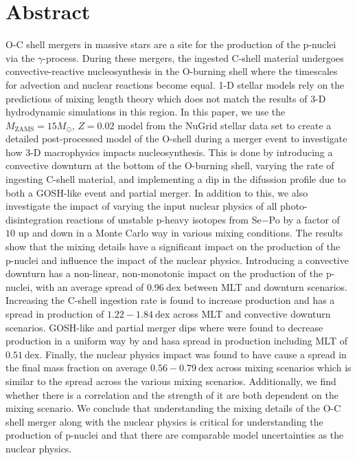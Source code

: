 \newpage
{}

\section*{\large Abstract}

O-C shell mergers in massive stars are a site for the production of the p-nuclei via the $\gamma$-process. 
During these mergers, the ingested C-shell material undergoes convective-reactive nucleosynthesis in the O-burning shell where the timescales for advection and nuclear reactions become equal.
1-D stellar models rely on the predictions of mixing length theory which does not match the results of 3-D hydrodynamic simulations in this region.
In this paper, we use the $M_{\mathrm{ZAMS}}=15 M_\odot$, $Z=0.02$ model from the NuGrid stellar data set \cite{ritterNuGridStellarData2018} to create a detailed post-processed model of the O-shell during a merger event to investigate how 3-D macrophysics impacts nucleosynthesis.
This is done by introducing a convective downturn at the bottom of the O-burning shell, varying the rate of ingesting C-shell material, and implementing a dip in the difussion profile due to both a GOSH-like event and partial merger.
In addition to this, we also investigate the impact of varying the input nuclear physics of all photo-disintegration reactions of unstable p-heavy isotopes from Se$-$Po by a factor of $10$ up and down in a Monte Carlo way in various mixing conditions.
The results show that the mixing details have a significant impact on the production of the p-nuclei and influence the impact of the nuclear physics.
Introducing a convective downturn has a non-linear, non-monotonic impact on the production of the p-nuclei, with an average spread of $0.96~\mathrm{dex}$ between MLT and downturn scenarios.
Increasing the C-shell ingestion rate is found to increase production and has a spread in production of $1.22-1.84~\mathrm{dex}$ across MLT and convective downturn scenarios.
GOSH-like and partial merger dips where were found to decrease production in a uniform way by and hasa  spread in production including MLT of $0.51~\mathrm{dex}$.
Finally, the nuclear physics impact was found to have cause a spread in the final mass fraction on average $0.56-0.79~\mathrm{dex}$ across mixing scenarios which is similar to the spread across the various mixing scenarios.
Additionally, we find whether there is a correlation and the strength of it are both dependent on the mixing scenario.
We conclude that understanding the mixing details of the O-C shell merger along with the nuclear physics is critical for understanding the production of p-nuclei and that there are comparable model uncertainties as the nuclear physics.

